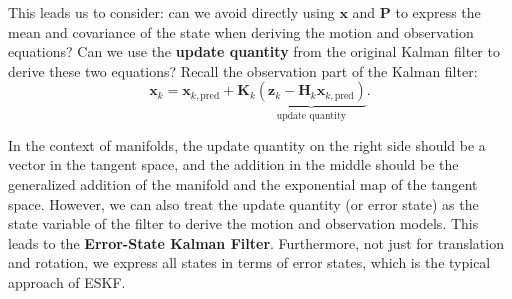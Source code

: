 This leads us to consider: can we avoid directly using $\mathbf{x}$ and $\mathbf{P}$ to express the mean and covariance of the state when deriving the motion and observation equations? Can we use the \textbf{update quantity} from the original Kalman filter to derive these two equations? Recall the observation part of the Kalman filter:
\begin{equation}\label{key}
	\mathbf{x}_k = \mathbf{x}_{k, \text{pred}} + \mathbf{K}_k \underbrace{(\mathbf{z}_k - \mathbf{H}_k \mathbf{x}_{k, \text{pred}})}_{\text{update quantity}}.
\end{equation}

In the context of manifolds, the update quantity on the right side should be a vector in the tangent space, and the addition in the middle should be the generalized addition of the manifold and the exponential map of the tangent space. However, we can also treat the update quantity (or error state) as the state variable of the filter to derive the motion and observation models. This leads to the \textbf{Error-State Kalman Filter}. Furthermore, not just for translation and rotation, we express all states in terms of error states, which is the typical approach of ESKF.

